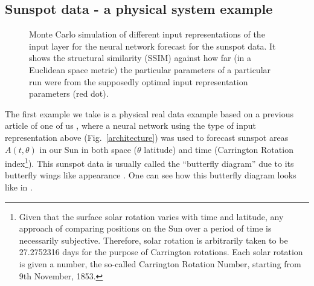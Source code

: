 \documentclass[journal]{IEEEtran}
\begin{document}
\subsection{Sunspot data - a physical system example}


\begin{figure}[!htb]
\centering
{}
\caption{Monte Carlo simulation of different  input representations  of the input layer for the neural network forecast for the sunspot data.
It shows the structural similarity (SSIM) against how far (in a Euclidean space metric) the particular parameters of a particular
run were from the supposedly optimal input representation parameters (red dot).}
\label{MonteCarloSSIMversusParameterMetricDistance}
\end{figure}

The first example we take is a physical real data example based on a previous article of one of us \cite{covaspeixinhojoao}, where a 
neural network using the type of input representation above (Fig.\ \ref{architecture}) was used to forecast sunspot areas $A(t,\theta)$ in our 
Sun in both space ($\theta$ latitude) and time (Carrington Rotation index\footnote{Given that the surface solar rotation 
varies with time and latitude,
any approach of comparing positions on the Sun over a period of time is necessarily subjective.
Therefore, solar rotation is arbitrarily taken to be 27.2752316 days
for the purpose of Carrington rotations. Each solar rotation is given a 
number, the so-called Carrington Rotation Number, starting from 9th November, 1853.}). This sunspot data is usually called the
``butterfly diagram'' due to its butterfly wings like appearance \cite{1904MNRAS..64..747M}. One can see how this butterfly diagram looks like in
\cite{BibEntry2018Mar}.
\end{document}
